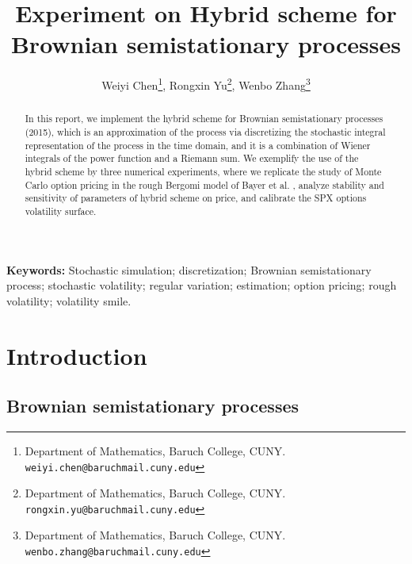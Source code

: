 \documentclass[12pt]{article}
\numberwithin{equation}{section}
\providecommand{\keywords}[1]{\textbf{Keywords:} #1}
\begin{document}
\title{\bf Experiment on Hybrid scheme for Brownian semistationary processes}

\author{
  Weiyi Chen\footnote{Department of Mathematics, Baruch College, CUNY. {\tt  weiyi.chen@baruchmail.cuny.edu}}{\setcounter{footnote}{1}},
  Rongxin Yu\footnote{Department of Mathematics, Baruch College, CUNY. {\tt  rongxin.yu@baruchmail.cuny.edu}}{\setcounter{footnote}{2}}, 
  Wenbo Zhang\footnote{Department of Mathematics, Baruch College, CUNY. {\tt wenbo.zhang@baruchmail.cuny.edu}{\setcounter{footnote}{3}}}
}



\maketitle\thispagestyle{empty}
 



\begin{abstract}
In this report, we implement the hybrid scheme for Brownian semistationary processes \cite{bennedsen2015hybrid} (2015), which is an approximation of the process via discretizing the stochastic integral representation of the process in the time domain, and it is a combination of Wiener integrals of the power function and a Riemann sum. We exemplify the use of the hybrid scheme by three numerical experiments, where we replicate the study of Monte Carlo option pricing in the rough Bergomi model of Bayer et al. \cite{bayer2015pricing}, analyze stability and sensitivity of parameters of hybrid scheme on price, and calibrate the SPX options volatility surface.
\end{abstract}

\keywords{Stochastic simulation; discretization; Brownian semistationary process; stochastic volatility; regular variation; estimation; option pricing; rough volatility; volatility smile.}

\clearpage



\section{Introduction}

\subsection{Brownian semistationary processes}
\end{document}
